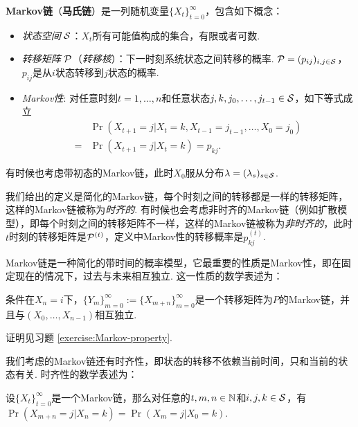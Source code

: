 \begin{definition}[Markov链]
\textbf{Markov链}（\textbf{马氏链}）是一列随机变量$\{X_t\}_{t=0}^{\infty}$，包含如下概念：
\begin{itemize}
	\item \emph{状态空间} $\mathcal S$：$X_t$所有可能值构成的集合，有限或者可数.
	\item \emph{转移矩阵} $\mathcal P$（\emph{转移核}）：下一时刻系统状态之间转移的概率. $\mathcal P=(p_{ij})_{i,j\in \mathcal S}$，$p_{ij}$是从$i$状态转移到$j$状态的概率.
	\item \emph{Markov性}: 对任意时刻$t=1,\dots,n$和任意状态$j,k,j_0,\dots,j_{t-1}\in \mathcal S$，如下等式成立
		\begin{align*}
		   &\Pr(X_{t+1}=j| X_t=k,X_{t-1}=j_{t-1},\dots,X_0=j_0)\\
           =&\Pr(X_{t+1}=j| X_{t}=k)=p_{kj}.
		\end{align*}
    \end{itemize}
    有时候也考虑带初态的Markov链，此时$X_0$服从分布$\lambda=(\lambda_s)_{s\in \mathcal S}$.
\end{definition}
我们给出的定义是简化的Markov链，每个时刻之间的转移都是一样的转移矩阵，这样的Markov链被称为\emph{时齐的}. 有时候也会考虑非时齐的Markov链（例如扩散模型），即每个时刻之间的转移矩阵不一样，这样的Markov链被称为\emph{非时齐的}，此时$t$时刻的转移矩阵是$\mathcal P^{(t)}$，定义中Markov性的转移概率是$p_{kj}^{(t)}$.

Markov链是一种简化的带时间的概率模型，它最重要的性质是Markov性，即在固定现在的情况下，过去与未来相互独立. 这一性质的数学表述为：
\begin{proposition}[Markov性]\label{prop:markov}
条件在$X_n=i$下，$\{Y_m\}_{m=0}^{\infty}:=\{X_{m+n}\}_{m=0}^{\infty}$是一个转移矩阵为$P$的Markov链，并且与$(X_0,\dots,X_{n-1})$相互独立.
\end{proposition}
证明见习题 \ref{exercise:Markov-property}.

我们考虑的Markov链还有时齐性，即状态的转移不依赖当前时间，只和当前的状态有关. 时齐性的数学表述为：
\begin{proposition}
    设$\{X_t\}_{t=0}^{\infty}$是一个Markov链，那么对任意的$t,m,n\in \mathbb{N}$和$i,j,k\in \mathcal S$，有
    $\Pr(X_{m+n}=j| X_{n}=k)=\Pr(X_{m}=j| X_{0}=k)$.
\end{proposition}


